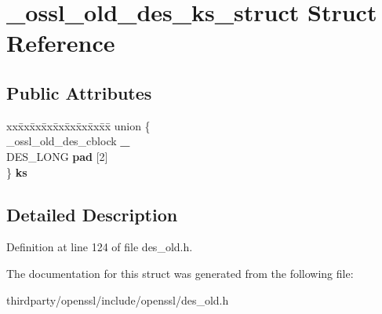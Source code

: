 \hypertarget{struct__ossl__old__des__ks__struct}{}\section{\+\_\+ossl\+\_\+old\+\_\+des\+\_\+ks\+\_\+struct Struct Reference}
\label{struct__ossl__old__des__ks__struct}
\subsection*{Public Attributes}
\begin{DoxyCompactItemize}
\item 
\mbox{\label{struct__ossl__old__des__ks__struct_a674e39ff5c63c846e545ce9914014348}} 
\begin{tabbing}
xx\=xx\=xx\=xx\=xx\=xx\=xx\=xx\=xx\=\kill
union \{\\
\>\_ossl\_old\_des\_cblock {\bfseries \_}\\
\>DES\_LONG {\bfseries pad} \mbox{[}2\mbox{]}\\
\} {\bfseries ks}\\

\end{tabbing}\end{DoxyCompactItemize}


\subsection{Detailed Description}


Definition at line 124 of file des\+\_\+old.\+h.



The documentation for this struct was generated from the following file\+:\begin{DoxyCompactItemize}
\item 
thirdparty/openssl/include/openssl/des\+\_\+old.\+h\end{DoxyCompactItemize}
